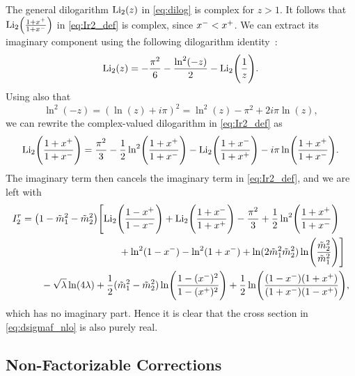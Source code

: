 The general dilogarithm $\operatorname{Li_2}(z)$ in \cref{eq:dilog} is complex for $z>1$.
It follows that $\operatorname{Li_2}\Bigl(\frac{1+x^+}{1+x^-}\Bigr)$ in \cref{eq:Ir2_def} is complex, since $x^- < x^+$.
We can extract its imaginary component using the following dilogarithm identity~\cite{Zagier:2007knq}:
\begin{equation}
    \operatorname{Li_2}(z) = -\frac{\pi^2}{6} - \frac{\ln^2(-z)}{2} - \operatorname{Li_2}\Biggl(\frac{1}{z}\Biggr).
\end{equation}
Using also that
\begin{equation}
    \ln^2(-z)=(\ln(z)+i\pi)^2=\ln^2(z) - \pi^2 + 2i\pi\ln(z),
\end{equation}
we can rewrite the complex-valued dilogarithm in \cref{eq:Ir2_def} as
\begin{equation}
    \operatorname{Li_2}\Biggl( \frac{1+x^+}{1+x^-} \Biggr)
    = \frac{\pi^2}{3}
    - \frac{1}{2}\ln^2\Biggl(\frac{1+x^+}{1+x^-}\Biggr)
    - \operatorname{Li_2}\Biggl(\frac{1+x^-}{1+x^+}\Biggr)
    - i\pi\ln\Biggl( \frac{1+x^+}{1+x^-} \Biggr).
    \label{eq:dilog_rewrite}
\end{equation}
The imaginary term then cancels the imaginary term in \cref{eq:Ir2_def}, and we are left with
\begin{equation}
\begin{split}
    I^r_2 &=
    \bigl( 1-\mt_1^2-\mt_2^2 \bigr) \Biggl[
        \Litwo\Biggl( \frac{1-\xp}{1-\xm} \Biggr)
        + \Litwo\Biggl( \frac{1+\xm}{1+\xp} \Biggr)
        - \frac{\pi^2}{3}
        + \frac{1}{2}\ln^2\Biggl( \frac{1+\xp}{1+\xm} \Biggr)
        \\ &\hspace{10em}
        + \ln^2(1-\xm) - \ln^2(1+\xm)
        + \ln(2\mt_1^2\mt_2^2) \ln\Biggl( \frac{\mt_2^2}{\mt_1^2} \Biggr)
    \Biggr]
    \\ &\qquad
    - \sqrt{\lambda}\ln(4\lambda)
    + \frac{1}{2}(\mt_1^2-\mt_2^2) \ln\Biggl( \frac{1-(\xm)^2}{1-(\xp)^2} \Biggr)
    + \frac{1}{2} \ln\Biggl( \frac{(1-\xm)(1+\xp)}{(1+\xm)(1-\xp)} \Biggr),
\end{split}
\label{eq:Ir2}
\end{equation}
which has no imaginary part.
Hence it is clear that the cross section in \cref{eq:dsigmaf_nlo} is also purely real.



\subsection{Non-Factorizable Corrections}\label{sec:non_factorizable}

